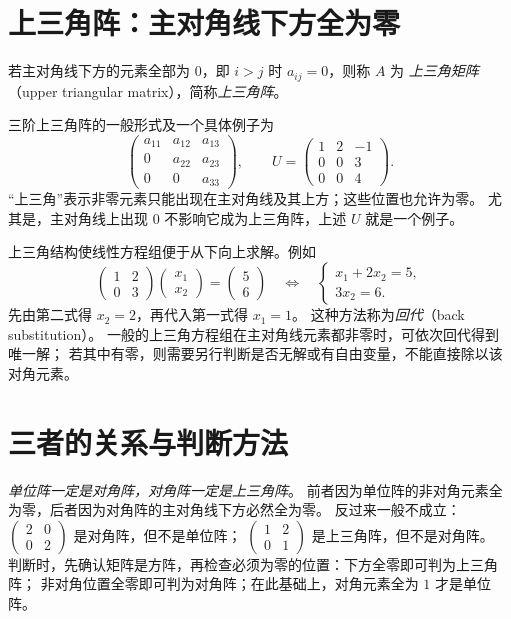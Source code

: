 \documentclass[UTF8,12pt,a4paper,fontset=fandol]{ctexart}
\begin{document}
\section{上三角阵：主对角线下方全为零}

\begin{definition}[上三角阵]
若主对角线下方的元素全部为 $0$，即 $i>j$ 时 $a_{ij}=0$，则称 $A$ 为
\emph{上三角矩阵}（upper triangular matrix），简称\emph{上三角阵}。
\end{definition}

三阶上三角阵的一般形式及一个具体例子为
\[
  \begin{pmatrix}a_{11}&a_{12}&a_{13}\\0&a_{22}&a_{23}\\0&0&a_{33}\end{pmatrix},
  \qquad
  U=\begin{pmatrix}1&2&-1\\0&0&3\\0&0&4\end{pmatrix}.
\]
“上三角”表示非零元素只能出现在主对角线及其上方；这些位置也允许为零。
尤其是，主对角线上出现 $0$ 不影响它成为上三角阵，上述 $U$ 就是一个例子。

上三角结构使线性方程组便于从下向上求解。例如
\[
  \begin{pmatrix}1&2\\0&3\end{pmatrix}
  \begin{pmatrix}x_1\\x_2\end{pmatrix}
  =\begin{pmatrix}5\\6\end{pmatrix}
  \quad\Longleftrightarrow\quad
  \begin{cases}x_1+2x_2=5,\\3x_2=6.\end{cases}
\]
先由第二式得 $x_2=2$，再代入第一式得 $x_1=1$。
这种方法称为\emph{回代}（back substitution）。
一般的上三角方程组在主对角线元素都非零时，可依次回代得到唯一解；
若其中有零，则需要另行判断是否无解或有自由变量，不能直接除以该对角元素。

\section{三者的关系与判断方法}

\emph{单位阵一定是对角阵，对角阵一定是上三角阵}。
前者因为单位阵的非对角元素全为零，后者因为对角阵的主对角线下方必然全为零。
反过来一般不成立：$\begin{pmatrix}2&0\\0&2\end{pmatrix}$ 是对角阵，但不是单位阵；
$\begin{pmatrix}1&2\\0&1\end{pmatrix}$ 是上三角阵，但不是对角阵。
判断时，先确认矩阵是方阵，再检查必须为零的位置：下方全零即可判为上三角阵；
非对角位置全零即可判为对角阵；在此基础上，对角元素全为 $1$ 才是单位阵。
\end{document}
